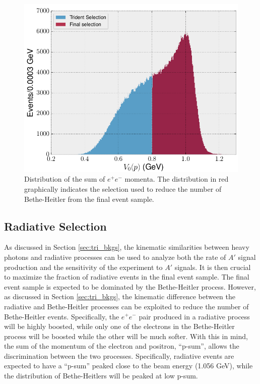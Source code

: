 \begin{figure}[ht]
    \centering
    \includegraphics[width=\textwidth]{images/20160504_psum.png}
    \caption{Distribution of the sum of $e^+e^-$ momenta.  The distribution in 
             red graphically indicates the selection used to reduce the number
             of Bethe-Heitler from the final event sample.}
    \label{fig:p_sum}
\end{figure}  

\subsection{Radiative Selection}

As discussed in Section \ref{sec:tri_bkgs}, the kinematic similarities between
heavy photons and
radiative processes can be used to analyze both the rate of $A'$ signal production
and the sensitivity of the experiment to $A'$ signals.  It is then crucial to
maximize the fraction of radiative events in the final event sample.  The final
event sample is expected to be dominated by the Bethe-Heitler process.  However,
as discussed in Section \ref{sec:tri_bkgs}, 
the kinematic difference between the radiative and Bethe-Heitler processes can 
be exploited to reduce the number of Bethe-Heitler events.  Specifically, the 
$e^+e^-$ pair produced in a radiative process will be highly boosted, while 
only one of the electrons in the Bethe-Heitler process will be boosted 
while the other will be much softer.  With this in mind, the sum of the momentum
of the electron and positron, ``p-sum'', allows the discrimination between the two processes.
Specifically, radiative events are expected to have a ``p-sum'' peaked 
close to the beam energy (1.056 GeV), while the distribution of Bethe-Heitlers 
will be peaked at low p-sum.

